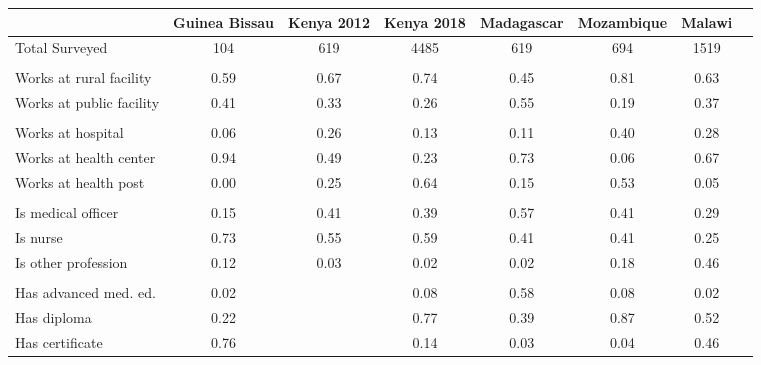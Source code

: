 \def\sym#1{\ifmmode^{#1}\else\(^{#1}\)\fi}
\begin{tabular}{l*{7}{c}}
\hline\hline
&\multicolumn{1}{c}{Guinea Bissau}&\multicolumn{1}{c}{Kenya 2012}&\multicolumn{1}{c}{Kenya 2018}&\multicolumn{1}{c}{Madagascar}&\multicolumn{1}{c}{Mozambique}&\multicolumn{1}{c}{Malawi}&\\
\hline
Total Surveyed&                        {104}&        {619}&  {4485}&      {619}&        {694}&        {1519}\\
  &  {}\\
Works at rural facility&       {0.59}&        {0.67}&  {0.74}&  {0.45}&    {0.81}&        {0.63}\\
Works at public facility&  {0.41}&    {0.33}&  {0.26}&  {0.55}&    {0.19}&        {0.37}\\
 &   {}\\
Works at hospital&             {0.06}&        {0.26}&  {0.13}&  {0.11}&    {0.40}&        {0.28}\\
Works at health center&        {0.94}&        {0.49}&  {0.23}&      {0.73}&        {0.06}&        {0.67}\\
Works at health post&          {0.00}&        {0.25}&  {0.64}&  {0.15}&    {0.53}&        {0.05}\\
 &   {}\\
Is medical officer&            {0.15}&        {0.41}&  {0.39}&  {0.57}&    {0.41}&        {0.29}\\
Is nurse&                              {0.73}&        {0.55}&  {0.59}&  {0.41}&    {0.41}&        {0.25}\\
Is other profession&           {0.12}&        {0.03}&  {0.02}&  {0.02}&    {0.18}&        {0.46}\\
&   {}\\
Has advanced med. ed.&         {0.02}&        {}&  {0.08}&  {0.58}&    {0.08}&        {0.02}\\
Has diploma&                           {0.22}&        {}&  {0.77}&  {0.39}&    {0.87}&        {0.52}\\
Has certificate&                       {0.76}&        {}&  {0.14}&  {0.03}&    {0.04}&        {0.46}\\
\hline
\end{tabular}